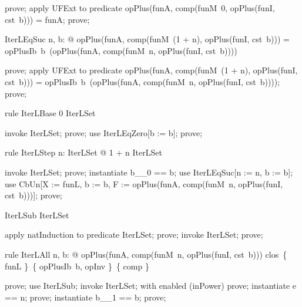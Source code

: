 \documentclass{article}
\begin{document}
\begin{zproof}
prove;
apply UFExt to predicate opPlus(funA, comp(funM~0, opPlus(funI, cst~b))) = funA;
prove;
\end{zproof}

\begin{theorem}{IterLEqSuc}
  \forall n, b: \nat @ opPlus(funA, comp(funM~(1 + n), opPlus(funI, cst~b))) = opPlusIb~b~(opPlus(funA, comp(funM~n, opPlus(funI, cst~b))))
\end{theorem}

\begin{zproof}
prove;
apply UFExt to predicate opPlus(funA, comp(funM~(1 + n), opPlus(funI, cst~b))) = opPlusIb~b~(opPlus(funA, comp(funM~n, opPlus(funI, cst~b))));
prove;
\end{zproof}

\begin{theorem}{rule IterLBase}
  0 \in IterLSet
\end{theorem}

\begin{zproof}
invoke IterLSet;
prove;
use IterLEqZero[b := b];
prove;
\end{zproof}

\begin{theorem}{rule IterLStep}
  \forall n: IterLSet @ 1 + n \in IterLSet
\end{theorem}

\begin{zproof}
invoke IterLSet;
prove;
instantiate b\_\_0 == b;
use IterLEqSuc[n := n, b := b];
use CbUn[X := funL, b := b, F := opPlus(funA, comp(funM~n, opPlus(funI, cst~b)))];
prove;
\end{zproof}

\begin{theorem}{IterLSub}
  \nat \subseteq IterLSet
\end{theorem}

\begin{zproof}
apply natInduction to predicate \nat \subseteq IterLSet;
prove;
invoke IterLSet;
prove;
\end{zproof}

\begin{theorem}{rule IterLAll}
  \forall n, b: \nat @ opPlus(funA, comp(funM~n, opPlus(funI, cst~b))) \in clos~\{ funL \}~\{ opPlusIb~b, opInv \}~\{ comp \}
\end{theorem}

\begin{zproof}
prove;
use IterLSub;
invoke IterLSet;
with enabled (inPower) prove;
instantiate e == n;
prove;
instantiate b\_\_1 == b;
prove;
\end{zproof}
\end{document}
